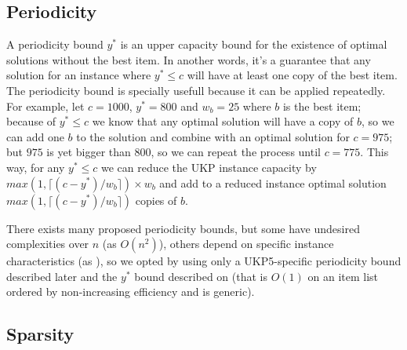 \documentclass[runningheads,a4paper]{llncs}
\begin{document}


\subsection{Periodicity}

A periodicity bound \(y^{*}\) is an upper capacity bound for the existence of optimal solutions without the best item. In another words, it's a guarantee that any solution for an instance where \(y^{*} \leq c\) will have at least one copy of the best item. The periodicity bound is specially usefull because it can be applied repeatedly. For example, let \(c = 1000\), \(y^{*} = 800\) and \(w_b = 25\) where \(b\) is the best item; because of \(y^{*} \leq c\) we know that any optimal solution will have a copy of \(b\), so we can add one \(b\) to the solution and combine with an optimal solution for \(c = 975\); but \(975\) is yet bigger than \(800\), so we can repeat the process until \(c = 775\). This way, for any \(y^{*} \leq c\) we can reduce the UKP instance capacity by \(max(1, \lceil(c-y^{*})/w_b\rceil)\times w_b\) and add to a reduced instance optimal solution \(max(1, \lceil(c-y^{*})/w_b\rceil)\) copies of \(b\).

There exists many proposed periodicity bounds, but some have undesired complexities over \(n\) (as \(O(n^2)\)\cite{badbound1}), others depend on specific instance characteristics (as \cite{badbound2}\cite{pya}), so we opted by using only a UKP5-specific periodicity bound described later and the \(y^{*}\) bound described on \cite[p. 223]{gar72} (that is \(O(1)\) on an item list ordered by non-increasing efficiency and is generic).

\subsection{Sparsity}

\end{document}
